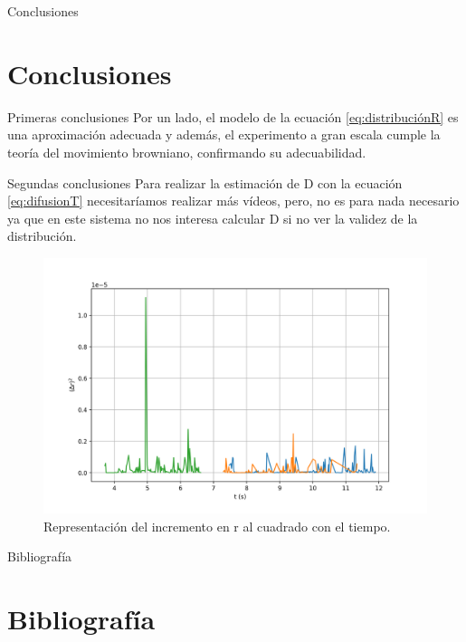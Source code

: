 \documentclass{beamer}
\begin{document}
\begin{frame}{Conclusiones}

\section{Conclusiones}

\begin{block}{Primeras conclusiones}
Por un lado, el modelo de la ecuación \ref{eq:distribuciónR} es una aproximación adecuada y además, el experimento a gran escala cumple la teoría del movimiento browniano, confirmando su adecuabilidad.
\end{block}

\begin{block}{Segundas conclusiones}
Para realizar la estimación de D con la ecuación \ref{eq:difusionT} necesitaríamos realizar más vídeos, pero, no es para nada necesario ya que en este sistema no nos interesa calcular D si no ver la validez de la distribución.
\end{block}

\begin{figure}[h!]
\begin{center}
\includegraphics[scale=0.14]{Camino libre.png}
\caption{Representación del incremento en r al cuadrado con el tiempo.}
\end{center}
\end{figure}
\end{frame}

\begin{frame}{Bibliografía}

\section{Bibliografía}

\printbibliography

\end{frame}
\end{document}
